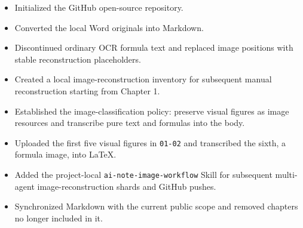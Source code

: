\begin{itemize}
\tightlist
\item
  Initialized the GitHub open-source repository.
\item
  Converted the local Word originals into Markdown.
\item
  Discontinued ordinary OCR formula text and replaced image positions with stable reconstruction placeholders.
\item
  Created a local image-reconstruction inventory for subsequent manual reconstruction starting from Chapter 1.
\item
  Established the image-classification policy: preserve visual figures as image resources and transcribe pure text and formulas into the body.
\item
  Uploaded the first five visual figures in \texttt{01-02} and transcribed the sixth, a formula image, into LaTeX.
\item
  Added the project-local \texttt{ai-note-image-workflow} Skill for subsequent multi-agent image-reconstruction shards and GitHub pushes.
\item
  Synchronized Markdown with the current public scope and removed chapters no longer included in it.
\end{itemize}

\clearpage
